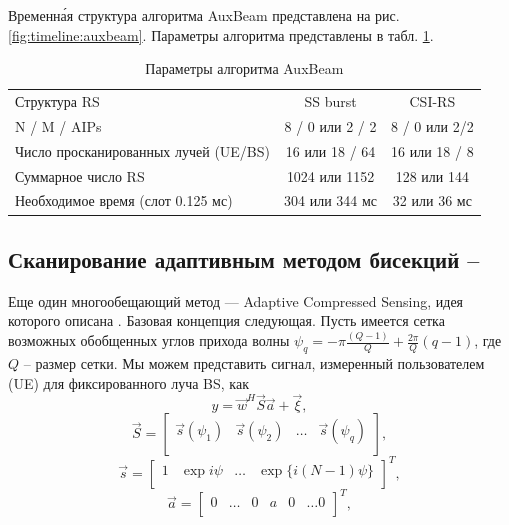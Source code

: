 Временн\'{а}я структура алгоритма AuxBeam представлена на рис. \ref{fig:timeline:auxbeam}. Параметры алгоритма представлены в табл. \ref{tab:parameters:auxbeam}.
\begin{table}
    \centering
    \caption{Параметры алгоритма AuxBeam}
    \label{tab:parameters:auxbeam}
    \begin{tabular}{lcc}
        \toprule
        \midrule
        Структура RS                         & SS burst        & CSI-RS        \\
        N / M / AIPs                         & 8 / 0 или 2 / 2 & 8 / 0 или 2/2 \\
        Число просканированных лучей (UE/BS) & 16 или 18 / 64  & 16 или 18 / 8 \\
        Суммарное число RS                   & 1024 или 1152   & 128 или 144   \\
        Необходимое время (слот 0.125 мс)    & 304 или 344 мс  & 32 или 36 мс  \\
        \hline
    \end{tabular}
\end{table}

\subsection[Сканирование адаптивным методом бисекций]{Сканирование адаптивным методом бисекций -- \ACS{}}
\label{sec:ACS:singlepath}

Еще один многообещающий метод —  Adaptive Compressed Sensing, идея которого описана \cite{Alkhateeb2014}.
Базовая концепция следующая. Пусть имеется сетка возможных
обобщенных углов прихода волны $\psi_q = - \pi\frac{(Q-1)}{Q} + \frac{2\pi}{Q} (q-1)$, где $Q$ -- размер сетки.
Мы можем представить сигнал, измеренный пользователем (UE) для фиксированного
луча BS, как
\begin{equation}
    \label{eq:4.42}
    y = \vec w^H\vec S \vec a + \vec \xi,
\end{equation}
\begin{equation}
    \label{eq:4.43}
    \vec S =
    \begin{bmatrix}
        \vec s(\psi_1) & \vec s(\psi_2) & \dots & \vec s(\psi_q) \\
    \end{bmatrix},
\end{equation}
\begin{equation}
    \label{eq:4.44}
    \vec s =
    \begin{bmatrix}
        1 & \exp{i\psi} & \dots & \exp\{ i(N-1)\psi\} \\
    \end{bmatrix}^T,
\end{equation}
\begin{equation}
    \label{eq:4.45}
    \vec a =
    \begin{bmatrix}
        0 & \dots & 0 & a & 0 & \dots 0 \\
    \end{bmatrix}^T,
\end{equation}

